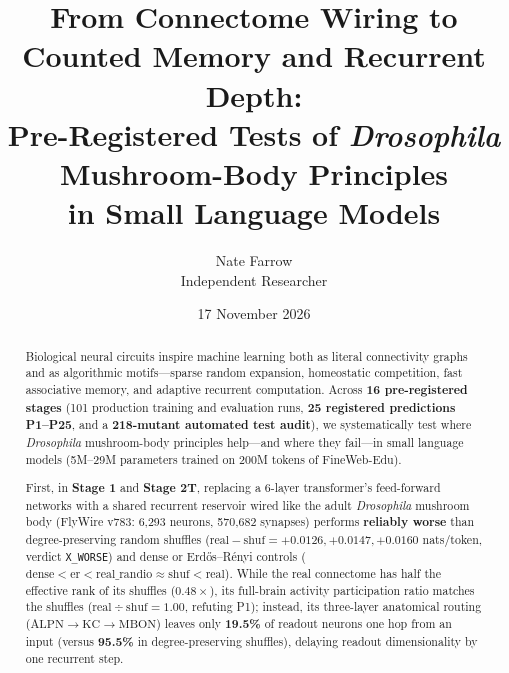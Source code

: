 \documentclass[11pt,a4paper]{article}
\title{\textbf{From Connectome Wiring to Counted Memory and Recurrent Depth:\\Pre-Registered Tests of \emph{Drosophila} Mushroom-Body Principles\\in Small Language Models}}
\author{Nate Farrow \\ \small Independent Researcher}
\date{17 November 2026}
\begin{document}
\maketitle

\begin{abstract}
Biological neural circuits inspire machine learning both as literal connectivity graphs and as algorithmic motifs---sparse random expansion, homeostatic competition, fast associative memory, and adaptive recurrent computation. Across \textbf{16 pre-registered stages} (101 production training and evaluation runs, \textbf{25 registered predictions P1--P25}, and a \textbf{218-mutant automated test audit}), we systematically test where \emph{Drosophila} mushroom-body principles help---and where they fail---in small language models (5M--29M parameters trained on 200M tokens of FineWeb-Edu).

First, in \textbf{Stage 1} and \textbf{Stage 2T}, replacing a 6-layer transformer's feed-forward networks with a shared recurrent reservoir wired like the adult \emph{Drosophila} mushroom body (FlyWire v783: 6,293 neurons, 570,682 synapses) performs \textbf{reliably worse} than degree-preserving random shuffles ($\text{real} - \text{shuf} = +0.0126, +0.0147, +0.0160$ nats/token, verdict \texttt{X\_WORSE}) and dense or Erd\H{o}s--R\'enyi controls ($\text{dense} < \text{er} < \text{real\_randio} \approx \text{shuf} < \text{real}$). While the real connectome has half the effective rank of its shuffles ($0.48\times$), its full-brain activity participation ratio matches the shuffles ($\text{real} \div \text{shuf} = 1.00$, refuting P1); instead, its three-layer anatomical routing ($\text{ALPN} \to \text{KC} \to \text{MBON}$) leaves only \textbf{19.5\%} of readout neurons one hop from an input (versus \textbf{95.5\%} in degree-preserving shuffles), delaying readout dimensionality by one recurrent step.


\end{abstract}
\end{document}
